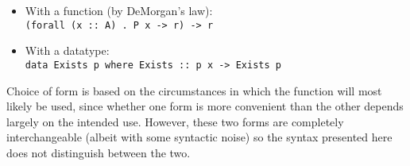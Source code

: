 \begin{itemize}
\item With a function (by DeMorgan's law): \\ \texttt{(forall (x :: A) . P 
x -> r) -> r}
\item With a datatype: \\ \texttt{data Exists p where Exists :: p x -> 
Exists p}
\end{itemize} 

Choice of form is based on the circumstances in which the function
will most likely be used, since whether one form is more convenient than the
other depends largely on the intended use. However, these two forms are
completely interchangeable (albeit with some syntactic noise) so the syntax
presented here does not distinguish between the two. 


